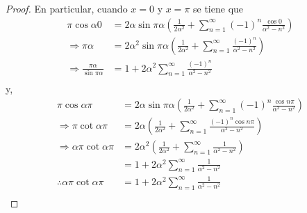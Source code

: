 \documentclass[12pt]{report}
\newcounter{it}
\theoremstyle{largebreak}
\begin{document}
\begin{proof}
        En particular, cuando $x=0$ y $x=\pi$ se tiene que
        \begin{equation*}
            \begin{split}
                \pi\cos \alpha 0&=2\alpha\sin\pi\alpha\left(\frac{1}{2\alpha^2}+\sum_{n=1}^{\infty}(-1)^n\frac{\cos 0}{\alpha^2-n^2}\right)\\
                \Rightarrow \pi\alpha&=2\alpha^2\sin\pi\alpha\left(\frac{1}{2\alpha^2}+\sum_{n=1}^{\infty}\frac{(-1)^n}{\alpha^2-n^2}\right)\\
                \Rightarrow \frac{\pi\alpha}{\sin\pi\alpha}&=1+2\alpha^2\sum_{n=1}^{\infty}\frac{(-1)^n}{\alpha^2-n^2}\\
            \end{split}
        \end{equation*}
        y,
        \begin{equation*}
            \begin{split}
                \pi\cos \alpha\pi&=2\alpha\sin\pi\alpha\left(\frac{1}{2\alpha^2}+\sum_{n=1}^{\infty}(-1)^n\frac{\cos n\pi}{\alpha^2-n^2}\right)\\
                \Rightarrow \pi\cot\alpha\pi&=2\alpha\left(\frac{1}{2\alpha^2}+\sum_{n=1}^{\infty}\frac{(-1)^n\cos n\pi}{\alpha^2-n^2}\right)\\
                \Rightarrow \alpha\pi\cot\alpha\pi&=2\alpha^2\left(\frac{1}{2\alpha^2}+\sum_{n=1}^{\infty}\frac{1}{\alpha^2-n^2}\right)\\
                &=1+2\alpha^2\sum_{n=1}^{\infty}\frac{1}{\alpha^2-n^2}\\
                \therefore\alpha\pi\cot\alpha\pi&=1+2\alpha^2\sum_{n=1}^{\infty}\frac{1}{\alpha^2-n^2}\\
            \end{split}
        \end{equation*}


\end{proof}
\end{document}
